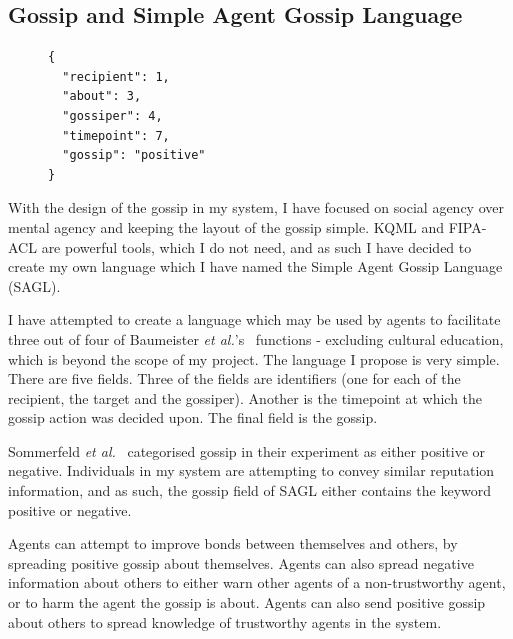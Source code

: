 \documentclass[]{final_report}
\newenvironment{mycode}{\captionsetup{type=listing}}{}
\begin{document}
\subsection{Gossip and Simple Agent Gossip Language}
\label{subs:sagl}
\begin{figure}
\vspace{-30pt}
\begin{framed}
	\begin{mycode}
		\begin{verbatim}
{
  "recipient": 1,
  "about": 3,
  "gossiper": 4,
  "timepoint": 7,
  "gossip": "positive"
}
		\end{verbatim}
	\label{listing:saglmessage}
\end{mycode}
\end{framed}
\vspace{-30pt}
\end{figure}
With the design of the gossip in my system, I have focused on social agency over mental agency and keeping the layout of the gossip simple. KQML and FIPA-ACL are powerful tools, which I do not need, and as such I have decided to create my own language which I have named the Simple Agent Gossip Language (SAGL).\par 
I have attempted to create a language which may be used by agents to facilitate three out of four of Baumeister \textit{et al.}'s~\cite{baumeister2004gossip} functions - excluding cultural education, which is beyond the scope of my project. The language I propose is very simple. There are five fields. Three of the fields are identifiers (one for each of the recipient, the target and the gossiper). Another is the timepoint at which the gossip action was decided upon. The final field is the gossip.\par
Sommerfeld \textit{et al.}~\cite{gossip_alt} categorised gossip in their experiment as either positive or negative. Individuals in my system are attempting to convey similar reputation information, and as such, the gossip field of SAGL either contains the keyword positive or negative.\par
Agents can attempt to improve bonds between themselves and others, by spreading positive gossip about themselves. Agents can also spread negative information about others to either warn other agents of a non-trustworthy agent, or to harm the agent the gossip is about. Agents can also send positive gossip about others to spread knowledge of trustworthy agents in the system.
\end{document}
